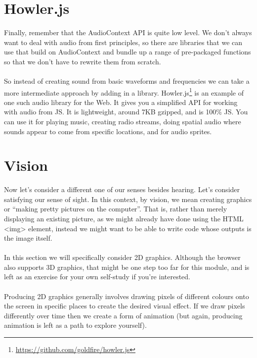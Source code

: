 \section{Howler.js}
\paragraph{} Finally, remember that the AudioContext API is quite low level. We don't always want to deal with audio from first principles, so there are libraries that we can use that build on AudioContext and bundle up a range of pre-packaged functions so that we don't have to rewrite them from scratch.
\paragraph{} So instead of creating sound from basic waveforms and frequencies we can take a more intermediate approach by adding in a library. Howler.js\footnote{\url{https://github.com/goldfire/howler.js}} is an example of one such audio library for the Web. It gives you a simplified API for working with audio from JS. It is lightweight, around 7KB gzipped, and is 100\% JS. You can use it for playing music, creating radio streams, doing spatial audio where sounds appear to come from specific locations, and for audio sprites.

\section{Vision}
\paragraph{} Now let's consider a different one of our senses besides hearing. Let's consider satisfying our sense of sight. In this context, by vision, we mean creating graphics or “making pretty pictures on the computer”. That is, rather than merely displaying an existing picture, as we might already have done using the HTML <img> element, instead we might want to be able to write code whose outputs is the image itself. 
\paragraph{} In this section we will specifically consider 2D graphics. Although the browser also supports 3D graphics, that might be one step too far for this module, and is left as an exercise for your own self-study if you're interested.
\paragraph{} Producing 2D graphics generally involves drawing pixels of different colours onto the screen in specific places to create the desired visual effect. If we draw pixels differently over time then we create a form of animation (but again, producing animation is left as a path to explore yourself). 
